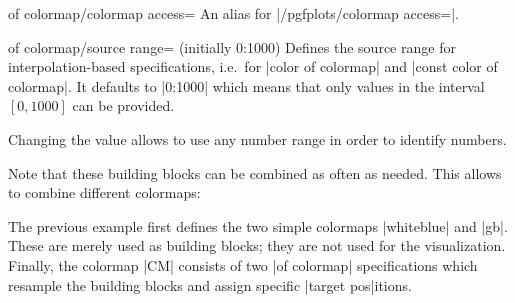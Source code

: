 {\begin{enumerate}
\begin{pgfplotskey}{of colormap/colormap access=}
	 An alias for |/pgfplots/colormap access=|.
\end{pgfplotskey}

\begin{pgfplotskey}{of colormap/source range= (initially 0:1000)}
	 Defines the source range for interpolation-based specifications, i.e.\ for |color of colormap| and |const color of colormap|. It defaults to |0:1000| which means that only values in the interval $[0,1000]$ can be provided. 

	 Changing the value allows to use any number range in order to identify numbers.
\begin{codeexample}[]
\pgfplotscolorbardrawstandalone[
	colormap={example}{%
	  colors of colormap={
	    -30000,-10000,0,100000,110000 of viridis, 
	  source range=-30000:120000}
	},
	colorbar horizontal,
	colormap access=const]
\end{codeexample}
\end{pgfplotskey}



\noindent Note that these building blocks can be combined as often as needed. This allows to combine different colormaps:
\begin{codeexample}[]
\pgfplotscolorbardrawstandalone[
	point meta min=-7046,
	point meta max=2895,
	colormap={whiteblue}{color=(blue) color=(white)},
	colormap={gb}{color=(green) color=(yellow) 
		color=(brown)},
	colormap={CM}{
		of colormap={
			whiteblue, 
			target pos={-7046,-6000,-5000,-3000,
				-1000,-750,-500,-250,-100,-50,0},
			sample for=const,
		},
		of colormap={
			gb, 
			target pos={10,100,200,500,1000,1100,
				1200,1500,2000,2895},
			sample for=const,
		}
	},
    colorbar horizontal,
    colormap access=const]
\end{codeexample}
\noindent The previous example first defines the two simple colormaps |whiteblue| and |gb|. These are merely used as building blocks; they are not used for the visualization. Finally, the colormap |CM| consists of two |of colormap|
 specifications which resample the building blocks and assign specific |target pos|itions.


\end{enumerate}}
